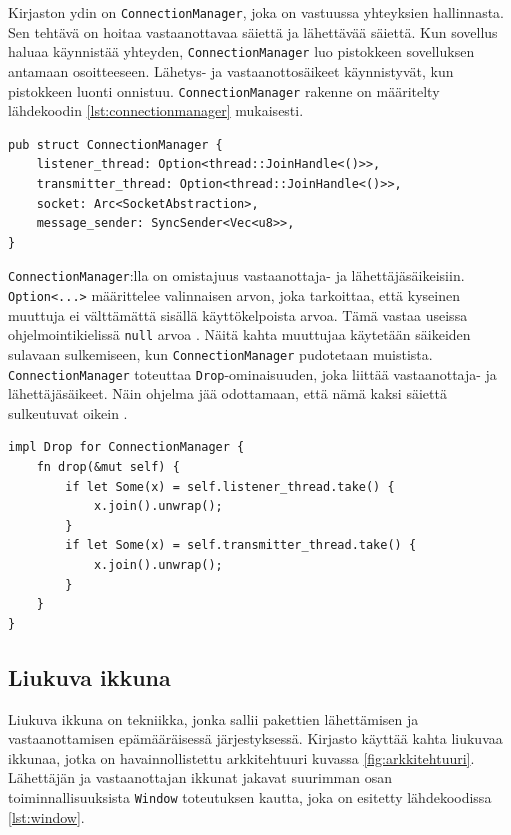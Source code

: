 \documentclass[a4paper,12pt]{article}
\begin{document}
    Kirjaston ydin on \lstinline{ConnectionManager}, joka on vastuussa yhteyksien hallinnasta. Sen tehtävä on
    hoitaa vastaanottavaa säiettä ja lähettävää säiettä. Kun sovellus haluaa käynnistää yhteyden,
    \lstinline{ConnectionManager} luo pistokkeen sovelluksen antamaan osoitteeseen.
    Lähetys- ja vastaanottosäikeet käynnistyvät, kun pistokkeen luonti onnistuu. \lstinline{ConnectionManager} rakenne on määritelty lähdekoodin \ref{lst:connectionmanager} mukaisesti.
    
    \begin{lstlisting}[caption={ConnectionManagerin rakenne}, label={lst:connectionmanager}]
pub struct ConnectionManager {
    listener_thread: Option<thread::JoinHandle<()>>,
    transmitter_thread: Option<thread::JoinHandle<()>>,
    socket: Arc<SocketAbstraction>,
    message_sender: SyncSender<Vec<u8>>,
}\end{lstlisting}

    

    \lstinline{ConnectionManager}:lla on omistajuus vastaanottaja- ja lähettäjäsäikeisiin.
    \lstinline{Option<...>} määrittelee valinnaisen arvon, joka tarkoittaa, että kyseinen muuttuja ei
    välttämättä sisällä käyttökelpoista arvoa. Tämä vastaa useissa ohjelmointikielissä \lstinline{null} arvoa \cite[luku 6.1]{rust-book}. Näitä kahta muuttujaa käytetään säikeiden sulavaan sulkemiseen, kun \lstinline{ConnectionManager} pudotetaan muistista. \lstinline{ConnectionManager} toteuttaa \lstinline{Drop}-ominaisuuden, joka liittää vastaanottaja-
    ja lähettäjäsäikeet. Näin ohjelma jää odottamaan, että nämä kaksi säiettä sulkeutuvat oikein \cite[\textit{JoinHandle}]{rust-std}.
    
    \architecture
    

    \begin{lstlisting}[caption={Drop-ominaisuuden toteutus ConnectionManager:ille}, label={lst:connectionmanager_drop}]
impl Drop for ConnectionManager {
    fn drop(&mut self) {
        if let Some(x) = self.listener_thread.take() {
            x.join().unwrap();
        }
        if let Some(x) = self.transmitter_thread.take() {
            x.join().unwrap();
        }
    }
}\end{lstlisting}



    \subsection{Liukuva ikkuna}\label{sec:liukuva_ikkuna}
    Liukuva ikkuna on tekniikka, jonka sallii pakettien lähettämisen ja vastaanottamisen epämääräisessä järjestyksessä. 
    Kirjasto käyttää kahta liukuvaa ikkunaa, jotka on havainnollistettu arkkitehtuuri kuvassa \ref{fig:arkkitehtuuri}. Lähettäjän ja vastaanottajan ikkunat jakavat suurimman osan toiminnallisuuksista \lstinline{Window} toteutuksen kautta, joka on esitetty lähdekoodissa \ref{lst:window}. 
\end{document}
